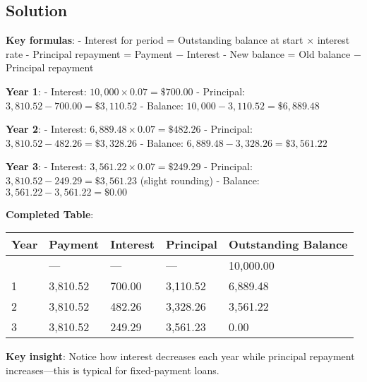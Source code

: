 \documentclass[
  letterpaper,
]{scrbook}
\begin{document}
\subsection*{Solution}\label{solution}

\begin{tcolorbox}[enhanced jigsaw, toptitle=1mm, colbacktitle=quarto-callout-tip-color!10!white, opacityback=0, leftrule=.75mm, breakable, colframe=quarto-callout-tip-color-frame, toprule=.15mm, opacitybacktitle=0.6, coltitle=black, bottomrule=.15mm, colback=white, arc=.35mm, titlerule=0mm, rightrule=.15mm, left=2mm, title={Click to reveal solution}, bottomtitle=1mm]

\textbf{Key formulas}: - Interest for period = Outstanding balance at
start × interest rate - Principal repayment = Payment − Interest - New
balance = Old balance − Principal repayment

\textbf{Year 1}: - Interest: \(10,000 \times 0.07 = \$700.00\) -
Principal: \(3,810.52 - 700.00 = \$3,110.52\) - Balance:
\(10,000 - 3,110.52 = \$6,889.48\)

\textbf{Year 2}: - Interest: \(6,889.48 \times 0.07 = \$482.26\) -
Principal: \(3,810.52 - 482.26 = \$3,328.26\) - Balance:
\(6,889.48 - 3,328.26 = \$3,561.22\)

\textbf{Year 3}: - Interest: \(3,561.22 \times 0.07 = \$249.29\) -
Principal: \(3,810.52 - 249.29 = \$3,561.23\) (slight rounding) -
Balance: \(3,561.22 - 3,561.22 = \$0.00\)

\textbf{Completed Table}:

\begin{longtable}[]{@{}lllll@{}}
\toprule\noalign{}
Year & Payment & Interest & Principal & Outstanding Balance \\
\midrule\noalign{}
\endhead
\bottomrule\noalign{}
\endlastfoot
0 & --- & --- & --- & 10,000.00 \\
1 & 3,810.52 & 700.00 & 3,110.52 & 6,889.48 \\
2 & 3,810.52 & 482.26 & 3,328.26 & 3,561.22 \\
3 & 3,810.52 & 249.29 & 3,561.23 & 0.00 \\
\end{longtable}

\FloatBarrier

\textbf{Key insight}: Notice how interest decreases each year while
principal repayment increases---this is typical for fixed-payment loans.

\end{tcolorbox}
\end{document}
